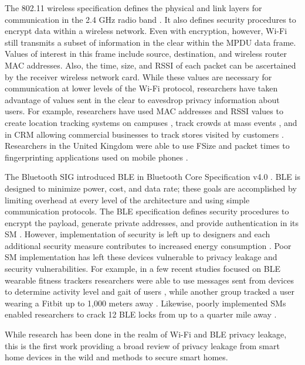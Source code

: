 \documentclass[conference]{./IEEEtran/IEEEtran}
\begin{document}
The 802.11 wireless specification defines the physical and link layers for communication in the 2.4 GHz radio band \cite{802.11}. It also defines security procedures to encrypt data within a wireless network. Even with encryption, however, Wi-Fi still transmits a subset of information in the clear within the \ac{MPDU} data frame. Values of interest in this frame include source, destination, and wireless router \ac{MAC} addresses. Also, the time, size, and \ac{RSSI} of each packet can be ascertained by the receiver wireless network card. While these values are necessary for communication at lower levels of the Wi-Fi protocol, researchers have taken advantage of values sent in the clear to eavesdrop privacy information about users. For example, researchers have used \ac{MAC} addresses and \ac{RSSI} values to create location tracking systems on campuses \cite{Zhou}, track crowds at mass events \cite{Bonne}, and in \ac{CRM} allowing commercial businesses to track stores visited by customers \cite{Atkinson}. Researchers in the United Kingdom were able to use \ac{FSize} and packet times to fingerprinting applications used on mobile phones \cite{Atkinson}.

The Bluetooth \ac{SIG} introduced \ac{BLE} in Bluetooth Core Specification v4.0 \cite{sig4.0}. \ac{BLE} is designed to minimize power, cost, and data rate; these goals are accomplished by limiting overhead at every level of the architecture and using simple communication protocols. The \ac{BLE} specification defines security procedures to encrypt the payload, generate private addresses, and provide authentication in its \ac{SM} \cite{sig4.2}. However, implementation of security is left up to designers and each additional security measure contributes to increased energy consumption \cite{Heydon}. Poor \ac{SM} implementation has left these devices vulnerable to privacy leakage and security vulnerabilities. For example, in a few recent studies focused on \ac{BLE} wearable fitness trackers researchers were able to use messages sent from devices to determine activity level and gait of users \cite{Das}, while another group tracked a user wearing a Fitbit up to 1,000 meters away \cite{RoseTrack}. Likewise, poorly implemented \ac{SM}s enabled researchers to crack 12 \ac{BLE} locks from up to a quarter mile away \cite{RoseLocks}.	

While research has been done in the realm of Wi-Fi and \ac{BLE} privacy leakage, this is the first work providing a broad review of privacy leakage from smart home devices in the wild and methods to secure smart homes.
\end{document}

